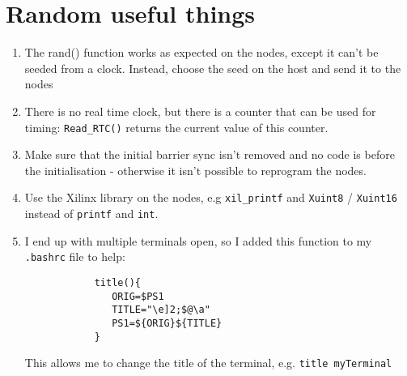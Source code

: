 \documentclass{article}
\begin{document}
	\section{Random useful things}
	\begin{enumerate}
		\item The rand() function works as expected on the nodes, except it can't be seeded from a clock. Instead, choose the seed on the host and send it to the nodes
		\item There is no real time clock, but there is a counter that can be used for timing: \verb|Read_RTC()| returns the current value of this counter.
		\item Make sure that the initial barrier sync isn't removed and no code is before the initialisation - otherwise it isn't possible to reprogram the nodes.
		\item Use the Xilinx library on the nodes, e.g \verb|xil_printf| and \verb|Xuint8| / \verb|Xuint16| instead of \verb|printf| and \verb|int|.
		\item I end up with multiple terminals open, so I added this function to my \verb|.bashrc| file to help:
			\begin{verbatim}
			title(){
			   ORIG=$PS1
			   TITLE="\e]2;$@\a"
			   PS1=${ORIG}${TITLE}
			}
			\end{verbatim}
		This allows me to change the title of the terminal, e.g. \verb|title myTerminal|
	\end{enumerate}
	
\end{document}

